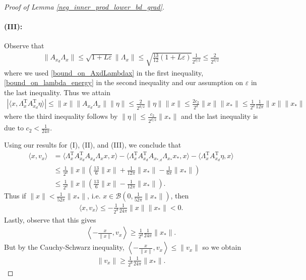 \documentclass[11pt]{article}
\renewcommand{\epsilon}{\varepsilon}
\renewcommand{\top}{{\mathrm{T}}}
\theoremstyle{remark}
\begin{document}
\begin{proof}[Proof of Lemma \ref{neg_inner_prod_lower_bd_grad}]
\paragraph{(III):}  Observe that \begin{align}
    \|A_{x_d}\Lambda_x\| \leqslant \sqrt{1 + L\epsilon}\|\Lambda_x\| \leqslant \sqrt{\frac{13}{12}(1+ L\epsilon)}\frac{1}{2^{d/2}} \leqslant \frac{2}{2^{d/2}} \label{bound_on_AxdLambdax_with_2}
\end{align} where we used \eqref{bound_on_AxdLambdax} in the first inequality,  \eqref{bound_on_lambda_energy} in the second inequality and our assumption on $\epsilon$ in the last inequality. Thus we attain \begin{align*}
    |\langle x, \Lambda_x^\top A_{x_d}^\top \eta \rangle | \leqslant \|x\|\|A_{x_d}\Lambda_x\|\|\eta\|\leqslant \frac{2}{2^{d/2}}\|\eta\|\|x\| \leqslant \frac{2c_2}{2^d}\|x\|\|x_*\| \leqslant \frac{1}{2^d}\frac{1}{12\pi}\|x\|\|x_*\|
\end{align*} where the third inequality follows by $\|\eta\| \leqslant \frac{c_2}{2^{d/2}}\|x_*\|$ and the last inequality is due to $c_2 < \frac{1}{24\pi}$.

Using our results for (I), (II), and (III), we conclude that \begin{align}
\langle x,v_x\rangle & = \langle \Lambda_x^\top A_{x_d}^\top A_{x_d} \Lambda_x x,x \rangle - \langle \Lambda_x^\top A_{x_d}^\top A_{x_{*,d}}\Lambda_{x_*}x_*,x \rangle - \langle \Lambda_x^\top A_{x_d}^\top \eta,x\rangle \nonumber \\
& \leqslant \frac{1}{2^d}\|x\|\left(\frac{13}{6}\|x\| + \frac{1}{12\pi}\|x_*\|- \frac{1}{6\pi}\|x_*\|\right) \nonumber \\
& \leqslant \frac{1}{2^d}\|x\|\left(\frac{13}{6}\|x\| - \frac{1}{12\pi}\|x_*\|\right) \nonumber .
\end{align} Thus if $\|x\| < \frac{1}{52\pi}\|x_*\|$, i.e. $x \in \mathcal{B}(0,\frac{1}{52\pi}\|x_*\|)$, then \begin{align}
\langle x,v_x \rangle \leqslant - \frac{1}{2^d}\frac{1}{24\pi}\|x\|\|x_*\| < 0. \label{inner_prod_neg_bound_w_constant}
\end{align} Lastly, observe that this gives \begin{align*}
    \left\langle -\frac{x}{\|x\|}, v_x \right\rangle \geqslant \frac{1}{2^d}\frac{1}{24\pi}\|x_*\|.
\end{align*} But by the Cauchy-Schwarz inequality, $\left\langle -\frac{x}{\|x\|},v_x\right\rangle \leqslant \|v_x\|$ so we obtain \begin{align}
    \|v_x\| \geqslant \frac{1}{2^d}\frac{1}{24\pi}\|x_*\|. \label{lower_bound_on_v_norm}
\end{align}


\end{proof}
\end{document}
